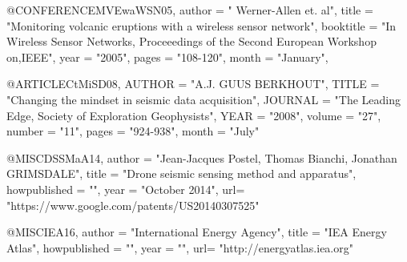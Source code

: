 @CONFERENCE{MVEwaWSN05,
  author =      " {Werner-Allen et. al}",
  title =        "{Monitoring volcanic eruptions with a   wireless sensor network}",
  booktitle =    "{In Wireless Sensor Networks, Proceeedings of the Second European Workshop on,IEEE}",
  year =         "{2005}",
  pages =      "{108-120}",
  month =        "{January}",
}

@ARTICLE{CtMiSD08,
  AUTHOR =       "A.J. GUUS BERKHOUT",
  TITLE =        "Changing the mindset in seismic data acquisition",
  JOURNAL =      "The Leading Edge, Society of Exploration Geophysists",
  YEAR =         "2008",
  volume =       "27",
  number =       "11",
  pages =        "924-938",
  month =        "July"
}

@MISC{DSSMaA14,
  author =       "{Jean-Jacques Postel, Thomas Bianchi, Jonathan GRIMSDALE}",
  title =        "Drone seismic sensing method and apparatus",
  howpublished = "",
  year =         "October 2014",
  url= "https://www.google.com/patents/US20140307525"
}

@MISC{IEA16,
  author =       "{International Energy Agency}",
  title =        "IEA Energy Atlas",
  howpublished = "",
  year =         "",
  url= "http://energyatlas.iea.org"
}


